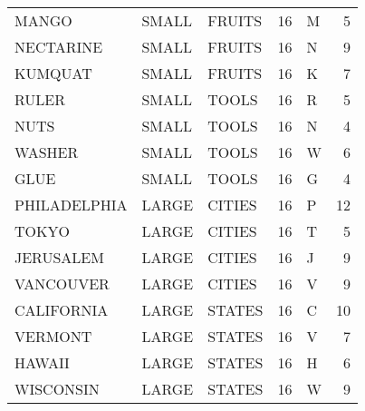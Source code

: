 \begin{tabular}{lllrlr}
       MANGO & SMALL &           FRUITS &       16 &            M &       5 \\
   NECTARINE & SMALL &           FRUITS &       16 &            N &       9 \\
     KUMQUAT & SMALL &           FRUITS &       16 &            K &       7 \\
       RULER & SMALL &            TOOLS &       16 &            R &       5 \\
        NUTS & SMALL &            TOOLS &       16 &            N &       4 \\
      WASHER & SMALL &            TOOLS &       16 &            W &       6 \\
        GLUE & SMALL &            TOOLS &       16 &            G &       4 \\
PHILADELPHIA & LARGE &           CITIES &       16 &            P &      12 \\
       TOKYO & LARGE &           CITIES &       16 &            T &       5 \\
   JERUSALEM & LARGE &           CITIES &       16 &            J &       9 \\
   VANCOUVER & LARGE &           CITIES &       16 &            V &       9 \\
  CALIFORNIA & LARGE &           STATES &       16 &            C &      10 \\
     VERMONT & LARGE &           STATES &       16 &            V &       7 \\
      HAWAII & LARGE &           STATES &       16 &            H &       6 \\
   WISCONSIN & LARGE &           STATES &       16 &            W &       9 \\
\bottomrule
\end{tabular}
